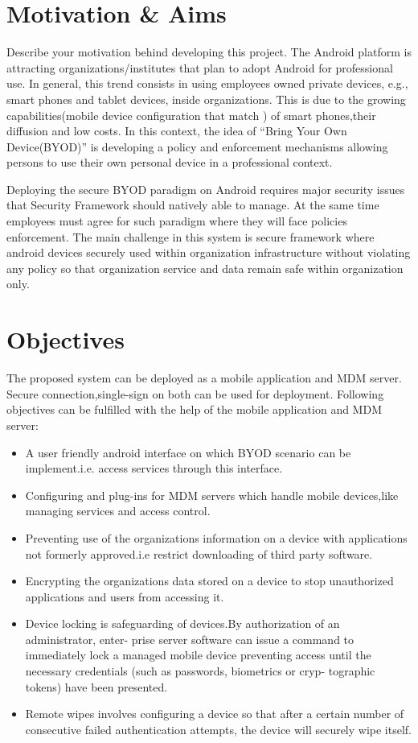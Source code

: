 \section{Motivation \& Aims}
\hspace{5mm} Describe your motivation behind developing this project.
\hspace{5mm} The Android platform is attracting organizations/institutes that plan to adopt Android for professional use. In general, this trend consists in using employees owned private devices, e.g., smart phones and tablet devices, inside organizations. This is due to the growing capabilities(mobile device configuration that match ) of smart phones,their diffusion and low costs.
In this context, the idea of “Bring Your Own Device(BYOD)” is developing a policy and enforcement mechanisms allowing persons to use their own personal device in a professional context.
\par Deploying the secure BYOD paradigm on Android requires major security issues that Security Framework should natively able to manage. At the same time employees must agree for such paradigm where they will face policies enforcement.
The main challenge in this system is secure framework where android devices securely used  within organization infrastructure without violating any policy so that organization service and data remain safe within organization only.  
 
%
\section{Objectives}
\hspace{5mm} The proposed system can be deployed as a mobile application and MDM server. Secure connection,single-sign on both can be used for deployment. Following objectives can be fulfilled with the help of the mobile application and MDM server:
\begin{itemize}
\item A user friendly android interface on which BYOD scenario can be implement.i.e. access
services through this interface.
\item Configuring and plug-ins for MDM servers which handle mobile devices,like managing
services and access control.
\item Preventing use of the organizations information on a device with applications not formerly
approved.i.e restrict downloading of third party software.
\item Encrypting the organizations data stored on a device to stop unauthorized applications
and users from accessing it.
\item Device locking is safeguarding of devices.By authorization of an administrator, enter-
prise server software can issue a command to immediately lock a managed mobile device
preventing access until the necessary credentials (such as passwords, biometrics or cryp-
tographic tokens) have been presented.
\item Remote wipes involves configuring a device so that after a certain number of consecutive
failed authentication attempts, the device will securely wipe itself.

\end{itemize}
